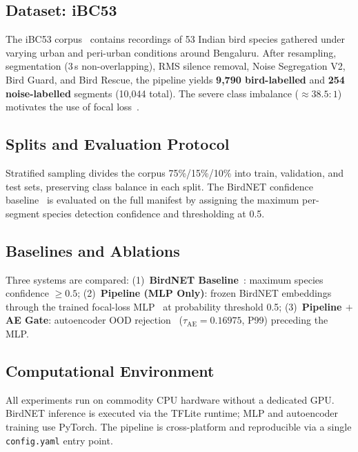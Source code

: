 \documentclass[a4paper,12pt]{article}
\begin{document}
\subsection{Dataset: iBC53}

\noindent
The iBC53 corpus~\cite{iBC53} contains recordings of 53 Indian bird species gathered under varying
urban and peri-urban conditions around Bengaluru. After resampling, segmentation (3\,s non-overlapping),
RMS silence removal, Noise Segregation V2, Bird Guard, and Bird Rescue, the pipeline yields
\textbf{9,790 bird-labelled} and \textbf{254 noise-labelled} segments (10,044 total). The severe
class imbalance ($\approx 38.5{:}1$) motivates the use of focal loss~\cite{FocalLoss}.

\subsection{Splits and Evaluation Protocol}

\noindent
Stratified sampling divides the corpus 75\%/15\%/10\% into train, validation, and test sets,
preserving class balance in each split. The BirdNET confidence baseline~\cite{BirdNET} is evaluated
on the full manifest by assigning the maximum per-segment species detection confidence and thresholding at 0.5.

\subsection{Baselines and Ablations}

\noindent
Three systems are compared: (1)~\textbf{BirdNET Baseline}~\cite{BirdNET}: maximum species
confidence $\geq 0.5$; (2)~\textbf{Pipeline (MLP Only)}: frozen BirdNET embeddings through the
trained focal-loss MLP~\cite{FocalLoss} at probability threshold 0.5; (3)~\textbf{Pipeline $+$ AE Gate}:
autoencoder OOD rejection~\cite{Ntalampiras,Hinton} ($\tau_{\mathrm{AE}} = 0.16975$, P99) preceding the MLP.

\subsection{Computational Environment}

\noindent
All experiments run on commodity CPU hardware without a dedicated GPU. BirdNET inference is
executed via the TFLite runtime; MLP and autoencoder training use PyTorch. The pipeline is
cross-platform and reproducible via a single \texttt{config.yaml} entry point.
\end{document}
